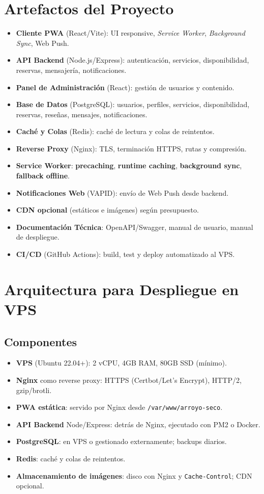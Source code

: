 \documentclass[12pt]{article}
\begin{document}
\section{Artefactos del Proyecto}
\begin{itemize}[left=0pt, itemsep=4pt]
  \item \textbf{Cliente PWA} (React/Vite): UI responsive, \textit{Service Worker}, \textit{Background Sync}, Web Push.
  \item \textbf{API Backend} (Node.js/Express): autenticación, servicios, disponibilidad, reservas, mensajería, notificaciones.
  \item \textbf{Panel de Administración} (React): gestión de usuarios y contenido.
  \item \textbf{Base de Datos} (PostgreSQL): usuarios, perfiles, servicios, disponibilidad, reservas, reseñas, mensajes, notificaciones.
  \item \textbf{Caché y Colas} (Redis): caché de lectura y colas de reintentos.
  \item \textbf{Reverse Proxy} (Nginx): TLS, terminación HTTPS, rutas y compresión.
  \item \textbf{Service Worker}: \textbf{precaching}, \textbf{runtime caching}, \textbf{background sync}, \textbf{fallback offline}.
  \item \textbf{Notificaciones Web} (VAPID): envío de Web Push desde backend.
  \item \textbf{CDN opcional} (estáticos e imágenes) según presupuesto.
  \item \textbf{Documentación Técnica}: OpenAPI/Swagger, manual de usuario, manual de despliegue.
  \item \textbf{CI/CD} (GitHub Actions): build, test y deploy automatizado al VPS.
\end{itemize}

\section{Arquitectura para Despliegue en VPS}
\subsection{Componentes}
\begin{itemize}[left=0pt, itemsep=4pt]
  \item \textbf{VPS} (Ubuntu 22.04+): 2 vCPU, 4GB RAM, 80GB SSD (mínimo).
  \item \textbf{Nginx} como reverse proxy: HTTPS (Certbot/Let's Encrypt), HTTP/2, gzip/brotli.
  \item \textbf{PWA estática}: servido por Nginx desde \texttt{/var/www/arroyo-seco}.
  \item \textbf{API Backend} Node/Express: detrás de Nginx, ejecutado con PM2 o Docker.
  \item \textbf{PostgreSQL}: en VPS o gestionado externamente; backups diarios.
  \item \textbf{Redis}: caché y colas de reintentos.
  \item \textbf{Almacenamiento de imágenes}: disco con Nginx y \texttt{Cache-Control}; CDN opcional.
\end{itemize}
\end{document}
